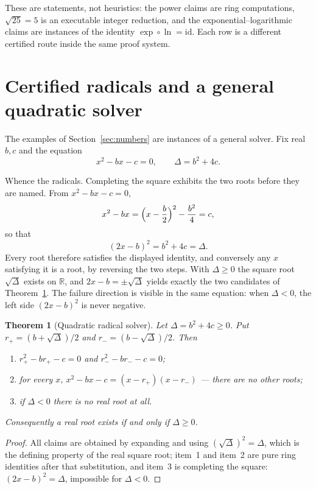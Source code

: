 \documentclass[submission,noinfoline]{jsfds}
\newtheorem{theorem}{Theorem}
\newcommand{\Lean}[1]{}
\begin{document}
These are statements, not heuristics: the power claims are ring
computations, $\sqrt{25}=5$ is an executable integer reduction, and the
exponential--logarithmic claims are instances of the identity
$\exp\circ\ln=\mathrm{id}$. Each row is a different certified route
inside the same proof system.

\section{Certified radicals and a general quadratic solver}\label{sec:computation}

The examples of Section~\ref{sec:numbers} are instances of a general
solver. Fix real $b,c$ and the equation
\begin{equation}\label{eq:quad}
  x^2-bx-c=0,\qquad \Delta=b^2+4c .
\end{equation}

Whence the radicals. Completing the square exhibits the two roots
before they are named. From $x^2-bx-c=0$,
\begin{equation*}
  x^2-bx=\Bigl(x-\frac b2\Bigr)^2-\frac{b^2}{4}=c,
\end{equation*}
so that
\begin{equation*}
  (2x-b)^2=b^2+4c=\Delta.
\end{equation*}
Every root therefore satisfies the displayed identity, and conversely
any $x$ satisfying it is a root, by reversing the two steps. With
$\Delta\ge0$ the square root $\sqrt\Delta$ exists on $\mathbb R$, and
$2x-b=\pm\sqrt\Delta$ yields exactly the two candidates of
Theorem~\ref{thm:quad}. The failure direction is visible in the same
equation: when $\Delta<0$, the left side $(2x-b)^2$ is never negative.

\begin{theorem}[Quadratic radical solver]\label{thm:quad}
Let $\Delta=b^2+4c\ge 0$. Put
$r_+=(b+\sqrt\Delta)/2$ and $r_-=(b-\sqrt\Delta)/2$. Then
\begin{enumerate}
\item $r_+^2-br_+-c=0$ and $r_-^2-br_--c=0$;
\item for every $x$, $x^2-bx-c=(x-r_+)(x-r_-)$ --- there are no other
roots;
\item if $\Delta<0$ there is no real root at all.
\end{enumerate}
Consequently a real root exists if and only if $\Delta\ge 0$.
\end{theorem}
\begin{proof}
All claims are obtained by expanding and using
$(\sqrt\Delta)^2=\Delta$, which is the defining property of the real
square root; item~1 and item~2 are pure ring identities after that
substitution, and item~3 is completing the square:
$(2x-b)^2=\Delta$, impossible for $\Delta<0$.
\Lean{quadRootPlus\_sq, quadRootMinus\_sq, quadFactor, quad\_no\_roots,
quad\_solvable\_iff}
\end{proof}
\end{document}
